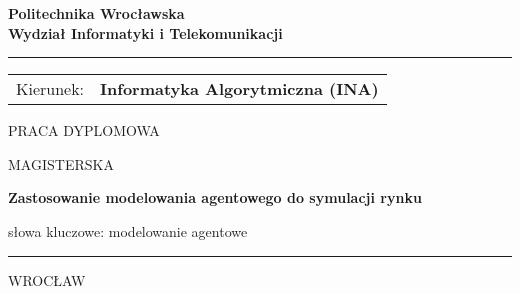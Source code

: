 \documentclass[12pt, oneside,a4 paper,table,usenames,dvipsnames]{book}
\theoremstyle{definition}
\begin{document}
\thispagestyle{empty}%

\begin{center}
\textbf{\LARGE Politechnika Wrocławska}
\\
\vspace{.2cm}\textbf{\Large Wydział Informatyki i Telekomunikacji}
		\vspace{-.3cm}\rule{\textwidth}{.1pt}
	\end{center}
 \vspace{.3cm}
	\begin{flushleft}
		\begin{minipage}[t]{\textwidth/2}
			\begin{tabular}{ l l }
				Kierunek: & \textbf{Informatyka Algorytmiczna (INA)} 
			\end{tabular}
		\end{minipage}
	\end{flushleft}
	
	\vspace{2cm}
	\begin{center}
		{\Huge
					\MakeUppercase{Praca dyplomowa}
					
					\vspace{.4em}\MakeUppercase{{magisterska}}%
      			
		\vspace{2cm plus .3fill}}

        {\huge \textbf{Zastosowanie modelowania agentowego do symulacji rynku}}\\
		
		\vspace{1.5cm}{\huge Agata Cieślik}
		
		\vspace{3cm}{\large Opiekun pracy}
		
		\vspace{.2cm}{\large\bfseries dr inż. Jakub Lemiesz}

	
	\end{center}
	\vspace{2.5cm}
	
	\begin{flushleft}
		\normalsize słowa kluczowe: modelowanie agentowe
	\end{flushleft}
	
	\begin{center}   
		\rule{\textwidth}{.2pt}
		
		\vspace{-.2cm}\large \MakeUppercase{Wrocław} \the\year
	\end{center}
\restoregeometry
\newpage
\setcounter{page}{2}
\end{document}
